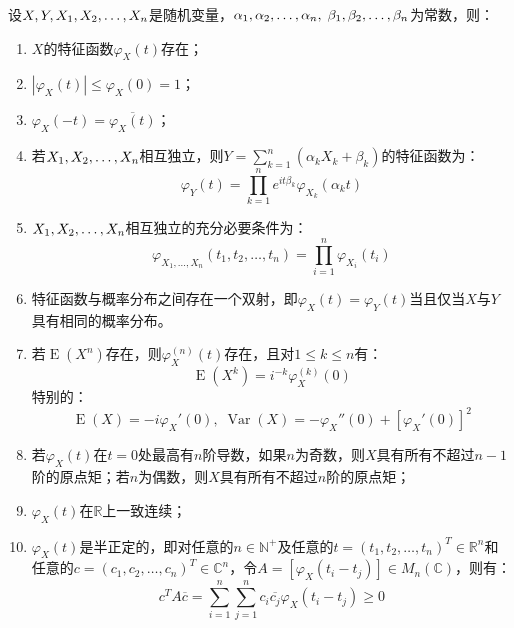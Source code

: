 \begin{property}\label{prop:CharacteristicFunction}
	设$X,Y,X_1, X_2, \dots, X_{n}$是随机变量，$\alpha_1, \alpha_2, \dots, \alpha_{n},\;\beta_1,\beta_2,\dots,\beta_n$为常数，则：
	\begin{enumerate}
		\item $X$的特征函数$\varphi_X(t)$存在；
		\item $|\varphi_X(t)|\leqslant\varphi_X(0)=1$；
		\item $\varphi_X(-t)=\overline{\varphi_X(t)}$；
		\item 若$X_1, X_2, \dots, X_{n}$相互独立，则$Y=\sum\limits_{k=1}^n(\alpha_kX_k+\beta_k)$的特征函数为：
		\begin{equation*}
			\varphi_{Y}(t)=\prod_{k=1}^ne^{it\beta_k}\varphi_{X_k}(\alpha_kt)
		\end{equation*}
		\item $X_1, X_2, \dots, X_{n}$相互独立的充分必要条件为：
		\begin{equation*}
			\varphi_{X_1,\dots,X_n}(t_1,t_2,\dots,t_n)=\prod_{i=1}^n\varphi_{X_i}(t_i)
		\end{equation*}
		\item 特征函数与概率分布之间存在一个双射，即$\varphi_X(t)=\varphi_Y(t)$当且仅当$X$与$Y$具有相同的概率分布。
		\item 若$\operatorname{E}(X^n)$存在，则$\varphi_X^{(n)}(t)$存在，且对$1\leqslant k\leqslant n$有：
		\begin{equation*}
			\operatorname{E}(X^k)=i^{-k}\varphi_X^{(k)}(0)
		\end{equation*}
		特别的：
		\begin{equation*}
			\operatorname{E}(X)=-i\varphi_X'(0),\;
			\operatorname{Var}(X)=-\varphi_X''(0)+[\varphi_X'(0)]^2
		\end{equation*}
		\item 若$\varphi_X(t)$在$t=0$处最高有$n$阶导数，如果$n$为奇数，则$X$具有所有不超过$n-1$阶的原点矩；若$n$为偶数，则$X$具有所有不超过$n$阶的原点矩；
		\item $\varphi_X(t)$在$\mathbb{R}$上一致连续；
		\item $\varphi_X(t)$是半正定的，即对任意的$n\in\mathbb{N}^+$及任意的$t=(t_1,t_2,\dots,t_n)^T\in\mathbb{R}^{n}$和任意的$c=(c_1,c_2,\dots,c_n)^T\in\mathbb{C}^{n}$，令$A=[\varphi_X(t_i-t_j)]\in M_{n}(\mathbb{C})$，则有：
		\begin{equation*}
			c^TA\overline{c}=\sum_{i=1}^{n}\sum_{j=1}^{n}c_i\overline{c_j}\varphi_X(t_i-t_j)\geqslant0
		\end{equation*}
	\end{enumerate}
\end{property}
